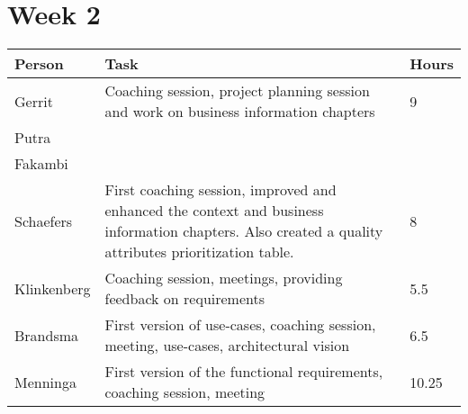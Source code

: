 \section{Week 2}
\begin{tabular}{L{0.2\textwidth} L{0.7\textwidth} L{0.1\textwidth}}
    \textbf{Person} & \textbf{Task} & \textbf{Hours} \\ \toprule
	Gerrit & Coaching session, project planning session and work on business information chapters & 9  \\ \midrule
	Putra &  &  \\ \midrule
	Fakambi & & \\ \midrule
	Schaefers & First coaching session, improved and enhanced the context and business information chapters. Also created a quality attributes prioritization table.& 8 \\ \midrule
	Klinkenberg & Coaching session, meetings, providing feedback on requirements & 5.5\\ \midrule
	Brandsma & First version of use-cases, coaching session, meeting, use-cases, architectural vision & 6.5 \\ \midrule
	Menninga & First version of the functional requirements, coaching session, meeting & 10.25 \\ \bottomrule
\end{tabular}